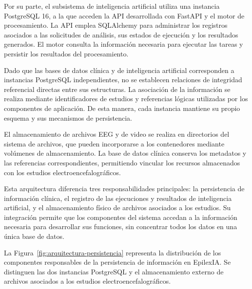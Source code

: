 Por su parte, el subsistema de inteligencia artificial
utiliza una instancia PostgreSQL 16, a la que acceden
la API desarrollada con FastAPI y el motor de procesamiento.
La API emplea SQLAlchemy para administrar los registros
asociados a las solicitudes de análisis, sus estados de
ejecución y los resultados generados. El motor consulta
la información necesaria para ejecutar las tareas y
persistir los resultados del procesamiento.


Dado que las bases de datos clínica y de inteligencia
artificial corresponden a instancias PostgreSQL
independientes, no se establecen relaciones de integridad
referencial directas entre sus estructuras. La asociación
de la información se realiza mediante identificadores
de estudios y referencias lógicas utilizadas por los
componentes de aplicación. De esta manera, cada instancia
mantiene su propio esquema y sus mecanismos de persistencia.


El almacenamiento de archivos EEG y de video se realiza
en directorios del sistema de archivos, que pueden
incorporarse a los contenedores mediante volúmenes de
almacenamiento. La base de datos clínica conserva los
metadatos y las referencias correspondientes, permitiendo
vincular los recursos almacenados con los estudios
electroencefalográficos.

Esta arquitectura diferencia tres responsabilidades
principales: la persistencia de información clínica,
el registro de las ejecuciones y resultados de
inteligencia artificial, y el almacenamiento físico
de archivos asociados a los estudios. Su integración
permite que los componentes del sistema accedan a la
información necesaria para desarrollar sus funciones,
sin concentrar todos los datos en una única base
de datos.

La Figura~\ref{fig:arquitectura-persistencia}
representa la distribución de los componentes
responsables de la persistencia de información
en EpilexIA. Se distinguen las dos instancias
PostgreSQL y el almacenamiento externo de archivos
asociados a los estudios electroencefalográficos.


